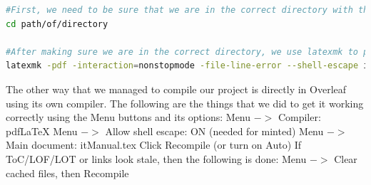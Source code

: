 \begin{lstlisting}[style=linuxstyle, language=bash]
#First, we need to be sure that we are in the correct directory with the use of cd.
cd path/of/directory

#After making sure we are in the correct directory, we use latexmk to put multiple other commands into one simple one.
latexmk -pdf -interaction=nonstopmode -file-line-error --shell-escape itManual.tex
\end{lstlisting}
\newline \newline
The other way that we managed to compile our project is directly in Overleaf using its own compiler. The following are the things that we did to get it working correctly using the Menu buttons and its options:
\newline \newline
Menu $->$ Compiler: pdfLaTeX\newline
Menu $->$ Allow shell escape: ON (needed for minted)\newline 
Menu $->$ Main document: itManual.tex\newline 
Click Recompile (or turn on Auto) \newline 
If ToC/LOF/LOT or links look stale, then the following is done: Menu $->$ Clear cached files, then Recompile
